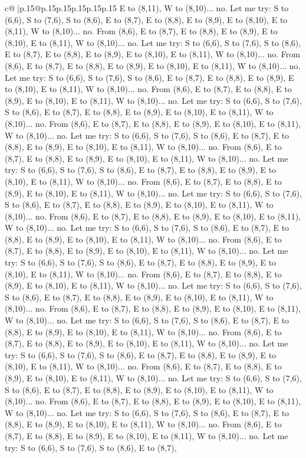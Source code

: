 \documentclass{article}
\begin{document}
{\begin{supertabular}{c@{$\;$}|p{.15\linewidth}@{}p{.15\linewidth}p{.15\linewidth}p{.15\linewidth}p{.15\linewidth}p{.15\linewidth}}
{{{E to (8,11), W to (8,10)... no. Let me try: S to (6,6), S to (7,6), S to (8,6), E to (8,7), E to (8,8), E to (8,9), E to (8,10), E to (8,11), W to (8,10)... no. From (8,6), E to (8,7), E to (8,8), E to (8,9), E to (8,10), E to (8,11), W to (8,10)... no. Let me try: S to (6,6), S to (7,6), S to (8,6), E to (8,7), E to (8,8), E to (8,9), E to (8,10), E to (8,11), W to (8,10)... no. From (8,6), E to (8,7), E to (8,8), E to (8,9), E to (8,10), E to (8,11), W to (8,10)... no. Let me try: S to (6,6), S to (7,6), S to (8,6), E to (8,7), E to (8,8), E to (8,9), E to (8,10), E to (8,11), W to (8,10)... no. From (8,6), E to (8,7), E to (8,8), E to (8,9), E to (8,10), E to (8,11), W to (8,10)... no. Let me try: S to (6,6), S to (7,6), S to (8,6), E to (8,7), E to (8,8), E to (8,9), E to (8,10), E to (8,11), W to (8,10)... no. From (8,6), E to (8,7), E to (8,8), E to (8,9), E to (8,10), E to (8,11), W to (8,10)... no. Let me try: S to (6,6), S to (7,6), S to (8,6), E to (8,7), E to (8,8), E to (8,9), E to (8,10), E to (8,11), W to (8,10)... no. From (8,6), E to (8,7), E to (8,8), E to (8,9), E to (8,10), E to (8,11), W to (8,10)... no. Let me try: S to (6,6), S to (7,6), S to (8,6), E to (8,7), E to (8,8), E to (8,9), E to (8,10), E to (8,11), W to (8,10)... no. From (8,6), E to (8,7), E to (8,8), E to (8,9), E to (8,10), E to (8,11), W to (8,10)... no. Let me try: S to (6,6), S to (7,6), S to (8,6), E to (8,7), E to (8,8), E to (8,9), E to (8,10), E to (8,11), W to (8,10)... no. From (8,6), E to (8,7), E to (8,8), E to (8,9), E to (8,10), E to (8,11), W to (8,10)... no. Let me try: S to (6,6), S to (7,6), S to (8,6), E to (8,7), E to (8,8), E to (8,9), E to (8,10), E to (8,11), W to (8,10)... no. From (8,6), E to (8,7), E to (8,8), E to (8,9), E to (8,10), E to (8,11), W to (8,10)... no. Let me try: S to (6,6), S to (7,6), S to (8,6), E to (8,7), E to (8,8), E to (8,9), E to (8,10), E to (8,11), W to (8,10)... no. From (8,6), E to (8,7), E to (8,8), E to (8,9), E to (8,10), E to (8,11), W to (8,10)... no. Let me try: S to (6,6), S to (7,6), S to (8,6), E to (8,7), E to (8,8), E to (8,9), E to (8,10), E to (8,11), W to (8,10)... no. From (8,6), E to (8,7), E to (8,8), E to (8,9), E to (8,10), E to (8,11), W to (8,10)... no. Let me try: S to (6,6), S to (7,6), S to (8,6), E to (8,7), E to (8,8), E to (8,9), E to (8,10), E to (8,11), W to (8,10)... no. From (8,6), E to (8,7), E to (8,8), E to (8,9), E to (8,10), E to (8,11), W to (8,10)... no. Let me try: S to (6,6), S to (7,6), S to (8,6), E to (8,7), E to (8,8), E to (8,9), E to (8,10), E to (8,11), W to (8,10)... no. From (8,6), E to (8,7), E to (8,8), E to (8,9), E to (8,10), E to (8,11), W to (8,10)... no. Let me try: S to (6,6), S to (7,6), S to (8,6), E to (8,7), E to (8,8), E to (8,9), E to (8,10), E to (8,11), W to (8,10)... no. From (8,6), E to (8,7), E to (8,8), E to (8,9), E to (8,10), E to (8,11), W to (8,10)... no. Let me try: S to (6,6), S to (7,6), S to (8,6), E to (8,7), E to (8,8), E to (8,9), E to (8,10), E to (8,11), W to (8,10)... no. From (8,6), E to (8,7), E to (8,8), E to (8,9), E to (8,10), E to (8,11), W to (8,10)... no. Let me try: S to (6,6), S to (7,6), S to (8,6), E to (8,7), }}}
\end{supertabular}}
\end{document}
